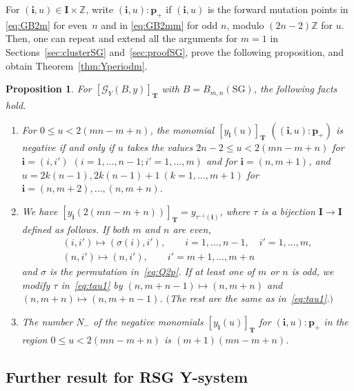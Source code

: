 \documentclass[pdftex]{sigma}
\numberwithin{equation}{section}
\newtheorem{Proposition}[Theorem]{Proposition}
\theoremstyle{definition}
\begin{document}
For $(\mathbf{i},u)\in \mathbf{I}\times \mathbb{Z}$,
write $(\mathbf{i},u):\mathbf{p}_+$
if $(\mathbf{i},u)$ is the forward mutation points
in \eqref{eq:GB2m} for even~$n$ and  in \eqref{eq:GB2mm} for odd $n$,
modulo $(2n-2)\mathbb{Z}$ for $u$.
Then, one can repeat and extend all the arguments for $m=1$
in Sections~\ref{sec:clusterSG} and~\ref{sec:proofSG},
prove the following proposition, and obtain
 Theorem~\ref{thm:Yperiodm}.

\begin{Proposition}
\label{prop:lev2m}
 For
$[\mathcal{G}_Y(B,y)]_{\mathbf{T}}$
with $B=B_{m,n}(\mathrm{SG})$, the following facts hold.
\begin{enumerate}\itemsep=0pt
\item[$(i)$]  For $0 \le u < 2(mn-m+n)$,
the  monomial $[y_{\mathbf{i}}(u)]_{\mathbf{T}}$
$((\mathbf{i},u):\mathbf{p}_+)$
is negative if and only if $u$ takes the values
$2n-2 \leq u < 2(mn-m+n)$
for $\mathbf{i}=(i,i')$ $(i=1,\dots,n-1;i'=1,\dots,m)$ and
for $\mathbf{i}
=(n,m+1)$,
and
$u=2k(n-1),2k(n-1)+1\ (k=1,\dots,m+1)$
for $\mathbf{i}=(n,m+2),\dots,(n,m+n)$.
\item[$(ii)$]
 We have $[y_{\mathbf{i}}(2(mn-m+n))]_{\mathbf{T}}
=y_{\tau^{-1}(\mathbf{i})}$,
where $\tau$ is a bijection $\mathbf{I} \rightarrow
\mathbf{I}$ defined as follows.
If both $m$ and $n$ are even,
\begin{gather}
(i,i')   \mapsto (\sigma(i),i'),
\qquad i=1,\dots,n-1,\quad i'=1,\dots,m,\nonumber\\
(n,i')   \mapsto
(n,i'),\qquad i'=m+1,\dots,m+n\label{eq:tau1}
\end{gather}
and $\sigma$ is the permutation in~\eqref{eq:Q2p}.
If at least one of
$m$ or $n$ is odd,
we modify $\tau$ in~\eqref{eq:tau1} by
$(n,m+n-1)\mapsto (n,m+n)$ and $(n,m+n)\mapsto (n,m+n-1)$.
$($The rest are the same as in~\eqref{eq:tau1}.$)$

\item[$(iii)$] The number $N_-$ of the negative monomials
$[y_{\mathbf{i}}(u)]_{\mathbf{T}}$ for $(\mathbf{i},u):\mathbf{p}_+$
in the region $0\leq u < 2(mn-m+n)$ is $(m+1)(mn-m+n)$.
\end{enumerate}
\end{Proposition}



\subsection{Further result for RSG Y-system}
\end{document}
